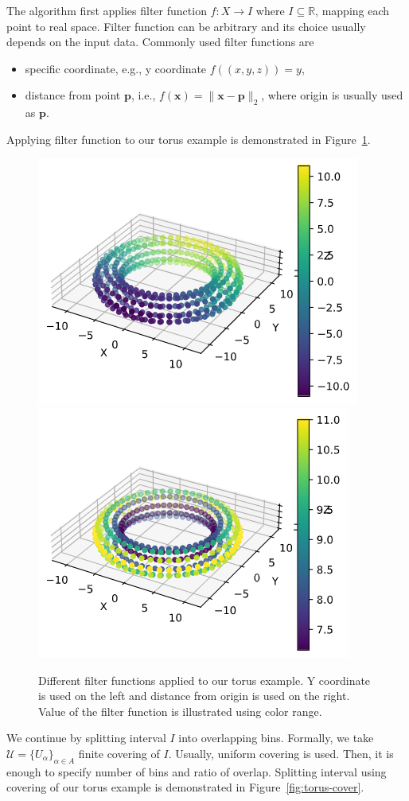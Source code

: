 \documentclass{article}
\begin{document}
The algorithm first applies filter function $f: X \to I$ where $I \subseteq \mathbb{R}$, mapping each point to real space.
Filter function can be arbitrary and its choice usually depends on the input data.
Commonly used filter functions are
\begin{itemize}
    \item specific coordinate, e.g., y coordinate $f((x, y, z)) = y$,
    \item distance from point $\mathbf{p}$, i.e., $f(\mathbf{x}) = \lVert \mathbf{x} - \mathbf{p} \rVert_2$, where origin is usually used as $\mathbf{p}$.
\end{itemize}
Applying filter function to our torus example is demonstrated in Figure~\ref{fig:torus-filter}.

\begin{figure}[ht]
    \centering
    \includegraphics[width=0.4\columnwidth]{torus-y-coor}
    \includegraphics[width=0.4\columnwidth]{torus-distance-from-origin}
    \caption{Different filter functions applied to our torus example.
        Y coordinate is used on the left and distance from origin is used on the right.
        Value of the filter function is illustrated using color range.}
    \label{fig:torus-filter}
\end{figure}

We continue by splitting interval $I$ into overlapping bins.
Formally, we take $\mathcal{U} = \{ U_\alpha \}_{\alpha \in A}$ finite covering of $I$.
Usually, uniform covering is used.
Then, it is enough to specify number of bins and ratio of overlap.
Splitting interval using covering of our torus example is demonstrated in Figure~\ref{fig:torus-cover}.
\end{document}
